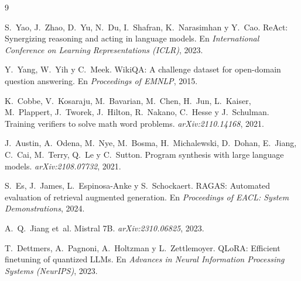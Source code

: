 \begin{thebibliography}{9}

S.~Yao, J.~Zhao, D.~Yu, N.~Du, I.~Shafran, K.~Narasimhan y Y.~Cao.
\newblock ReAct: Synergizing reasoning and acting in language models.
\newblock En \emph{International Conference on Learning Representations (ICLR)}, 2023.

Y.~Yang, W.~Yih y C.~Meek.
\newblock WikiQA: A challenge dataset for open-domain question answering.
\newblock En \emph{Proceedings of EMNLP}, 2015.

K.~Cobbe, V.~Kosaraju, M.~Bavarian, M.~Chen, H.~Jun, L.~Kaiser, M.~Plappert, J.~Tworek, J.~Hilton, R.~Nakano, C.~Hesse y J.~Schulman.
\newblock Training verifiers to solve math word problems.
\newblock \emph{arXiv:2110.14168}, 2021.

J.~Austin, A.~Odena, M.~Nye, M.~Bosma, H.~Michalewski, D.~Dohan, E.~Jiang, C.~Cai, M.~Terry, Q.~Le y C.~Sutton.
\newblock Program synthesis with large language models.
\newblock \emph{arXiv:2108.07732}, 2021.

S.~Es, J.~James, L.~Espinosa-Anke y S.~Schockaert.
\newblock RAGAS: Automated evaluation of retrieval augmented generation.
\newblock En \emph{Proceedings of EACL: System Demonstrations}, 2024.

A.~Q.~Jiang et~al.
\newblock Mistral 7B.
\newblock \emph{arXiv:2310.06825}, 2023.

T.~Dettmers, A.~Pagnoni, A.~Holtzman y L.~Zettlemoyer.
\newblock QLoRA: Efficient finetuning of quantized LLMs.
\newblock En \emph{Advances in Neural Information Processing Systems (NeurIPS)}, 2023.

\end{thebibliography}
